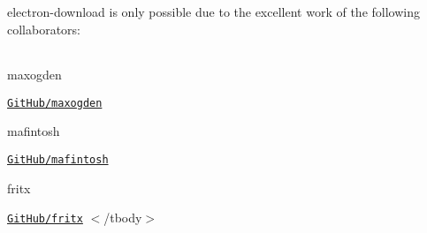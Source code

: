 electron-\/download is only possible due to the excellent work of the following collaborators\+:

\tabulinesep=1mm
\begin{longtabu} spread 0pt [c]{*{0}{|X[-1]}|}
\hline
\end{longtabu}


maxogden

\href{https://github.com/maxogden}{\tt Git\+Hub/maxogden} 

mafintosh

\href{https://github.com/mafintosh}{\tt Git\+Hub/mafintosh} 

fritx

\href{https://github.com/fritx}{\tt Git\+Hub/fritx} $<$/tbody$>$